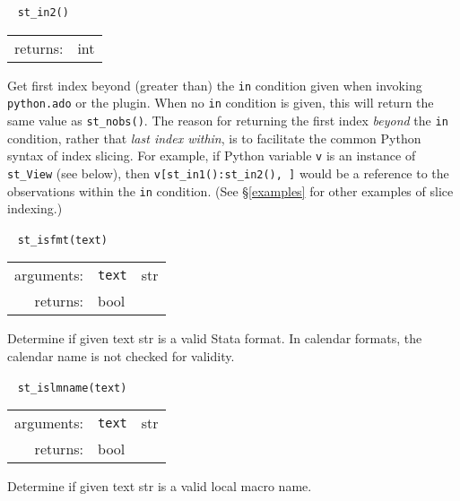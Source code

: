 \documentclass{article}
\begin{document}
			
			\ \newline
			\noindent \lstinline$st_in2()$
								
			\vspace{1.5mm}
			\noindent 
			\indent \begin{tabular}{rl}
					returns: & int
				\end{tabular}
								
			\vspace{1.5mm}
			\noindent Get first index beyond (greater than) the \texttt{in} condition given when invoking \lstinline{python.ado} or the plugin. When no \texttt{in} condition is given, this will return the same value as \lstinline$st_nobs()$. The reason for returning the first index {\em beyond} the \texttt{in} condition, rather that {\em last index within}, is to facilitate the common Python syntax of index slicing. For example, if Python variable \texttt{v} is an instance of \lstinline{st_View} (see below), then \lstinline$v[st_in1():st_in2(), ]$ would be a reference to the observations within the \texttt{in} condition. (See \S\ref{examples} for other examples of slice indexing.) \newline
			
			
			\ \newline
			\noindent \lstinline$st_isfmt(text)$
								
			\vspace{1.5mm}
			\noindent 
			\indent \begin{tabular}{rrl}
					arguments: & \texttt{text} & str \\
					returns: & \multicolumn{2}{l}{bool}
				\end{tabular}
								
			\vspace{1.5mm}
			\noindent Determine if given text str is a valid Stata format. In calendar formats, the calendar name is not checked for validity. \newline
			
			
			\ \newline
			\noindent \lstinline$st_islmname(text)$
								
			\vspace{1.5mm}
			\noindent 
			\indent \begin{tabular}{rrl}
					arguments: & \texttt{text} & str \\
					returns: & \multicolumn{2}{l}{bool}
				\end{tabular}
								
			\vspace{1.5mm}
			\noindent Determine if given text str is a valid local macro name. \newline
			
\end{document}
